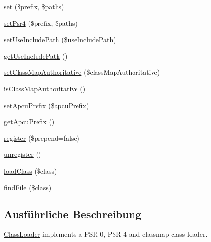 \begin{DoxyCompactItemize}
\item 
\mbox{\hyperlink{class_composer_1_1_autoload_1_1_class_loader_a76f8e2aa4329d78063cc7932108891ce}{set}} (\$prefix, \$paths)
\item 
\mbox{\hyperlink{class_composer_1_1_autoload_1_1_class_loader_a11d2831d7657855b5c07cb6885dd86ef}{set\+Psr4}} (\$prefix, \$paths)
\item 
\mbox{\hyperlink{class_composer_1_1_autoload_1_1_class_loader_a350f3d947ee3e29b0ac0e09e4a086642}{set\+Use\+Include\+Path}} (\$use\+Include\+Path)
\item 
\mbox{\hyperlink{class_composer_1_1_autoload_1_1_class_loader_aeb0360ce32c89c3d50cf5b054aef0d59}{get\+Use\+Include\+Path}} ()
\item 
\mbox{\hyperlink{class_composer_1_1_autoload_1_1_class_loader_ab393ccb89c488ca52fe97865b0957196}{set\+Class\+Map\+Authoritative}} (\$class\+Map\+Authoritative)
\item 
\mbox{\hyperlink{class_composer_1_1_autoload_1_1_class_loader_abaf3d2e9cad5d740b6a29c44b36cf015}{is\+Class\+Map\+Authoritative}} ()
\item 
\mbox{\hyperlink{class_composer_1_1_autoload_1_1_class_loader_aa45cccfd4849b1225f20d32c044579fd}{set\+Apcu\+Prefix}} (\$apcu\+Prefix)
\item 
\mbox{\hyperlink{class_composer_1_1_autoload_1_1_class_loader_aca46c66a148234ea06274030062d0cdf}{get\+Apcu\+Prefix}} ()
\item 
\mbox{\hyperlink{class_composer_1_1_autoload_1_1_class_loader_a478eedf860efe1bc1b2408fc28656111}{register}} (\$prepend=false)
\item 
\mbox{\hyperlink{class_composer_1_1_autoload_1_1_class_loader_a2472d57551ee473381beea31ff642136}{unregister}} ()
\item 
\mbox{\hyperlink{class_composer_1_1_autoload_1_1_class_loader_aee0b004fbf0743f16dab70f8a52f983e}{load\+Class}} (\$class)
\item 
\mbox{\hyperlink{class_composer_1_1_autoload_1_1_class_loader_a505e9f4e4a29f6bd47bc694e78ae46c3}{find\+File}} (\$class)
\end{DoxyCompactItemize}


\subsection{Ausführliche Beschreibung}
\mbox{\hyperlink{class_composer_1_1_autoload_1_1_class_loader}{Class\+Loader}} implements a P\+S\+R-\/0, P\+S\+R-\/4 and classmap class loader. 


